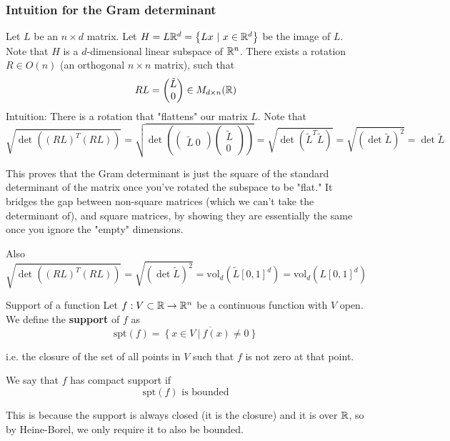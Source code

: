 \documentclass[12pt]{article}
\begin{document}
\subsubsection*{Intuition for the Gram determinant}

Let $L$ be an $n \times d$ matrix. Let $H = L \mathbb{R}^d= \left\{ L x \ |\ x \in \mathbb{R}^d \right\}$ be the image of $L$. Note that $H$ is a $d$-dimensional linear subspace of $\mathbb{R}^n$. There exists a rotation $R \in O(n)$ (an orthogonal $n \times n$ matrix), such that
$$
    R L = \begin{pmatrix} \tilde{L} \\ 0 \end{pmatrix} \in M_{d \times n}(\mathbb{R})
$$
Intuition: There is a rotation that "flattens" our matrix $L$. Note that
$$
    \sqrt{\det\left( (RL)^T (RL)\right)} = \sqrt{\det\left( \begin{pmatrix} \tilde{L}\ 0 \end{pmatrix} \begin{pmatrix} \tilde{L} \\ 0 \end{pmatrix} \right)} = \sqrt{\det \left( \tilde{L}^T \tilde{L}\right)} = \sqrt{\left(\det \tilde{L}\right)^2} = \det \tilde{L}
$$

This proves that the Gram determinant is just the square of the standard determinant of the matrix once you've rotated the subspace to be "flat." It bridges the gap between non-square matrices (which we can't take the determinant of), and square matrices, by showing they are essentially the same once you ignore the "empty" dimensions.

Also
$$
\sqrt{\det\left( (RL)^T (RL)\right)} = \sqrt{\left(\det \tilde{L}\right)^2} = \mathrm{vol}_d(\tilde{L} [0, 1]^d) = \mathrm{vol}_d(L [0, 1]^d)
$$

\begin{definition}{Support of a function}{}
    Let $f: V \subset \mathbb{R} \rightarrow \mathbb{R}^n$ be a continuous function with $V$ open. We define the \textbf{support} of $f$ as
    $$
        \mathrm{spt}(f) = \overline{\left\{ x \in V \ |\ f(x) \neq 0 \right\}}
    $$

    i.e. the closure of the set of all points in $V$ such that $f$ is not zero at that point.

    We say that $f$ has compact support if
    $$
        \mathrm{spt}(f) \text{ is bounded}
    $$

    This is because the support is always closed (it is the closure) and it is over $\mathbb{R}$, so by Heine-Borel, we only require it to also be bounded.
\end{definition}
\end{document}

